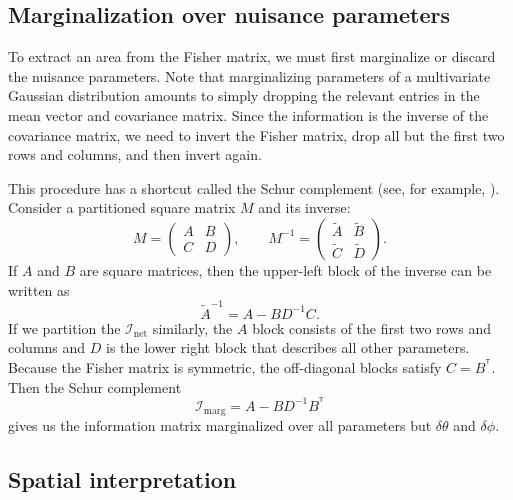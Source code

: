 \documentclass[amsmath,amssymb,aps,prx,reprint,nopreprintnumbers,nofootinbib]{revtex4-1}
\newcommand\transpose{\ensuremath{^{^\mathsf{T}}}}
\begin{document}
\subsection{Marginalization over nuisance parameters}

To extract an area from the Fisher matrix, we must first marginalize or discard the nuisance parameters. Note that marginalizing parameters of a multivariate Gaussian distribution amounts to simply dropping the relevant entries in the mean vector and covariance matrix. Since the information is the inverse of the covariance matrix, we need to invert the Fisher matrix, drop all but the first two rows and columns, and then invert again.

This procedure has a shortcut called the Schur complement (see, for example, \citealt{numerical-recipes-inversion-partition}). Consider a partitioned square matrix $M$ and its inverse:
%
\begin{equation}
    M = \left(
        \begin{array}{cc}
            A & B \\
            C & D
        \end{array}
    \right), \qquad
    M^{-1} = \left(
        \begin{array}{cc}
            \tilde{A} & \tilde{B} \\
            \tilde{C} & \tilde{D}
        \end{array}
    \right).
\end{equation}
%
If $A$ and $B$ are square matrices, then the upper-left block of the inverse can be written as
%
\begin{equation}
    \tilde{A}^{-1} = A - B D^{-1} C.
\end{equation}
%
If we partition the $\mathcal{I}_\mathrm{net}$ similarly, the $A$ block consists of the first two rows and columns and $D$ is the lower right block that describes all other parameters. Because the Fisher matrix is symmetric, the off\nobreakdashes-diagonal blocks satisfy $C = B\transpose$. Then the Schur complement
%
\begin{equation}\label{eq:marginal-fisher-matrix}
    \mathcal{I}_\mathrm{marg} = A - B D^{-1} B\transpose
\end{equation}
%
gives us the information matrix marginalized over all parameters but $\delta\theta$ and $\delta\phi$.

\subsection{Spatial interpretation}
\end{document}
